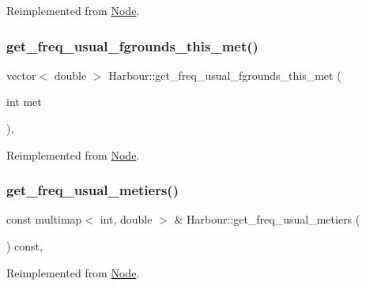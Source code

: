 Reimplemented from \mbox{\hyperlink{class_node_a37fdbc3ddd2cd48c49d196a14c0740b4}{Node}}.

\mbox{\label{class_harbour_a9702a762029d20bb8885e7f6d8ec0f94}} 
\subsubsection{\texorpdfstring{get\_freq\_usual\_fgrounds\_this\_met()}{get\_freq\_usual\_fgrounds\_this\_met()}}
{\footnotesize\ttfamily vector$<$ double $>$ Harbour\+::get\+\_\+freq\+\_\+usual\+\_\+fgrounds\+\_\+this\+\_\+met (\begin{DoxyParamCaption}\item[{int}]{met }\end{DoxyParamCaption})\hspace{0.3cm}{\ttfamily [override]}, {\ttfamily [virtual]}}



Reimplemented from \mbox{\hyperlink{class_node_ab317835e72ccdd4c508be8b1667bc56f}{Node}}.

\mbox{\label{class_harbour_af10263daa61fa705e1bf4be8504eb652}} 
\subsubsection{\texorpdfstring{get\_freq\_usual\_metiers()}{get\_freq\_usual\_metiers()}}
{\footnotesize\ttfamily const multimap$<$ int, double $>$ \& Harbour\+::get\+\_\+freq\+\_\+usual\+\_\+metiers (\begin{DoxyParamCaption}{ }\end{DoxyParamCaption}) const\hspace{0.3cm}{\ttfamily [override]}, {\ttfamily [virtual]}}



Reimplemented from \mbox{\hyperlink{class_node_a28923d8314c4f43a9df9a74216bff48a}{Node}}.

\mbox{\label{class_harbour_aa7ca7b59418bb965fe0630cbe118eea4}} 
